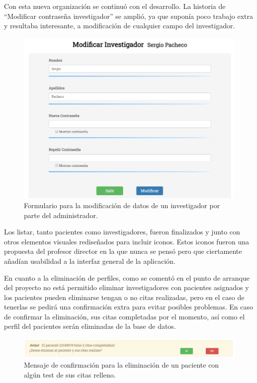 Con esta nueva organización se continuó con el desarrollo. La historia de ``Modificar contraseña investigador'' se amplió, ya que suponía poco trabajo extra y resultaba interesante, a modificación de cualquier campo del investigador.

\begin{figure}[h]
    \centering
     \includegraphics[width=1\textwidth]{images/modificarInvestigador.jpg}
    \caption{Formulario para la modificación de datos de un investigador por parte del administrador.}
\end{figure}

Los listar, tanto pacientes como investigadores, fueron finalizados y junto con otros elementos visuales rediseñados para incluir iconos. Estos iconos fueron una propuesta del profesor director en la que nunca se pensó pero que ciertamente añadían usabilidad a la interfaz general de la aplicación.\newline

En cuanto a la eliminación de perfiles, como se comentó en el punto de arranque del proyecto no está permitido eliminar investigadores con pacientes asignados y los pacientes pueden eliminarse tengan o no citas realizadas, pero en el caso de tenerlas se pedirá una confirmación extra para evitar posibles problemas. En caso de confirmar la eliminación, sus citas completadas por el momento, así como el perfil del pacientes serán eliminadas de la base de datos.

\begin{figure}[h]
    \centering
     \includegraphics[width=1\textwidth]{images/confirmacionEliminarPaciente.jpg}
    \caption{Mensaje de confirmación para la eliminación de un paciente con algún test de sus citas relleno.}
\end{figure}
\newpage

